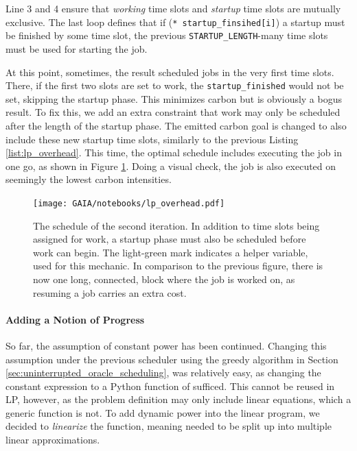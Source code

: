 Line 3 and 4 ensure that \emph{working} time slots and \emph{startup} time slots are mutually exclusive.
The last loop defines that if (\verb|* startup_finsihed[i]|) a startup must be finished by some time slot, the previous \verb|STARTUP_LENGTH|-many time slots must be used for starting the job.

At this point, sometimes, the result scheduled jobs in the very first time slots.
There, if the first two slots are set to work, the \verb|startup_finished| would not be set, skipping the startup phase.
This minimizes carbon but is obviously a bogus result.
To fix this, we add an extra constraint that work may only be scheduled after the length of the startup phase.
The emitted carbon goal is changed to also include these new startup time slots, similarly to the previous Listing \ref{list:lp_overhead}. 
This time, the optimal schedule includes executing the job in one go, as shown in Figure \ref{fig:lp_overhead}.
Doing a visual check, the job is also executed on seemingly the lowest carbon intensities.

\begin{figure}
    \texttt{[image: GAIA/notebooks/lp\_overhead.pdf]}
    \caption{The schedule of the second iteration. In addition to time slots being assigned for work, a startup phase must also be scheduled before work can begin. The light-green mark indicates a helper variable, used for this mechanic. In comparison to the previous figure, there is now one long, connected, block where the job is worked on, as resuming a job carries an extra cost.}
    \label{fig:lp_overhead}
\end{figure}

\newpage
\paragraph{Adding a Notion of Progress}

So far, the assumption of constant power has been continued.
Changing this assumption under the previous scheduler using the greedy algorithm in Section \ref{sec:uninterrupted_oracle_scheduling}, was relatively easy, as changing the constant expression to a Python function of \modelname{} sufficed. 
This cannot be reused in LP, however, as the problem definition may only include linear equations, which a generic function is not. 
To add dynamic power into the linear program, we decided to \emph{linearize} the function, meaning \modelname{} needed to be split up into multiple linear approximations.

